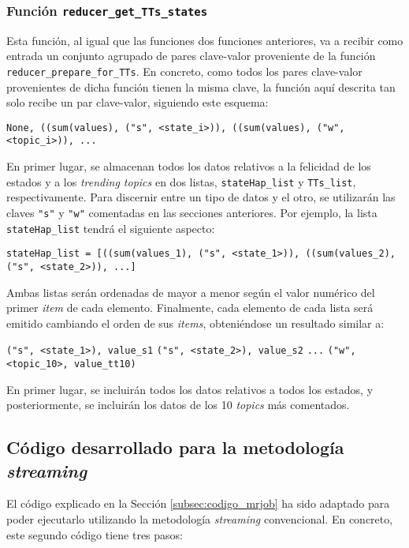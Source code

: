 \documentclass[10pt, spanish]{article}
\begin{document}
\subsubsection{Función \texttt{reducer\_get\_TTs\_states}}

Esta función, al igual que las funciones dos funciones anteriores, va a recibir como entrada un conjunto agrupado de pares clave-valor proveniente de la función \texttt{reducer\_prepare\_for\_TTs}. En concreto, como todos los pares clave-valor provenientes de dicha función tienen la misma clave, la función aquí descrita tan solo recibe un par clave-valor, siguiendo este esquema:

\texttt{None, ((sum(values), ("s", <state\_i>)), ((sum(values), ("w", <topic\_i>)), ...}

En primer lugar, se almacenan todos los datos relativos a la felicidad de los estados y a los \textit{trending topics} en dos listas, \texttt{stateHap\_list} y \texttt{TTs\_list}, respectivamente. Para discernir entre un tipo de datos y el otro, se utilizarán las claves \texttt{"s"} y \texttt{"w"} comentadas en las secciones anteriores. Por ejemplo, la lista \texttt{stateHap\_list} tendrá el siguiente aspecto:

\texttt{stateHap\_list = [((sum(values\_1), ("s", <state\_1>)), ((sum(values\_2), ("s", <state\_2>)), ...]}

Ambas listas serán ordenadas de mayor a menor según el valor numérico del primer \textit{item} de cada elemento. Finalmente, cada elemento de cada lista será emitido cambiando el orden de sus \textit{items}, obteniéndose un resultado similar a:

\texttt{("s", <state\_1>), value\_s1}
\texttt{("s", <state\_2>), value\_s2}
\texttt{...}
\texttt{("w", <topic\_10>, value\_tt10)}

En primer lugar, se incluirán todos los datos relativos a todos los estados, y posteriormente, se incluirán los datos de los 10 \textit{topics} más comentados.

\subsection{Código desarrollado para la metodología \textit{streaming}}
\label{subsec:codigo_streaming}

El código explicado en la Sección \ref{subsec:codigo_mrjob} ha sido adaptado para poder ejecutarlo utilizando la metodología \textit{streaming} convencional. En concreto, este segundo código tiene tres pasos:
\end{document}
